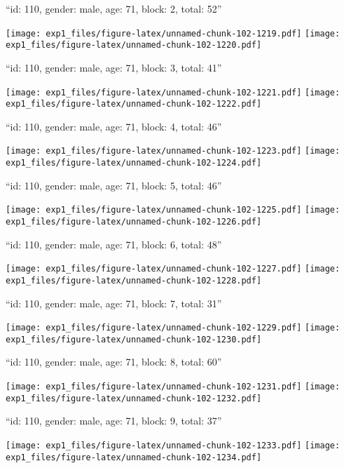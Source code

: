 \documentclass[11pt,,]{article}
\begin{document}
\newpage
[1] 

``id: 110, gender: male, age: 71, block: 2, total: 52''

\texttt{[image: exp1\_files/figure-latex/unnamed-chunk-102-1219.pdf]}
\texttt{[image: exp1\_files/figure-latex/unnamed-chunk-102-1220.pdf]}

\newpage
[1] 

``id: 110, gender: male, age: 71, block: 3, total: 41''

\texttt{[image: exp1\_files/figure-latex/unnamed-chunk-102-1221.pdf]}
\texttt{[image: exp1\_files/figure-latex/unnamed-chunk-102-1222.pdf]}

\newpage
[1] 

``id: 110, gender: male, age: 71, block: 4, total: 46''

\texttt{[image: exp1\_files/figure-latex/unnamed-chunk-102-1223.pdf]}
\texttt{[image: exp1\_files/figure-latex/unnamed-chunk-102-1224.pdf]}

\newpage
[1] 

``id: 110, gender: male, age: 71, block: 5, total: 46''

\texttt{[image: exp1\_files/figure-latex/unnamed-chunk-102-1225.pdf]}
\texttt{[image: exp1\_files/figure-latex/unnamed-chunk-102-1226.pdf]}

\newpage
[1] 

``id: 110, gender: male, age: 71, block: 6, total: 48''

\texttt{[image: exp1\_files/figure-latex/unnamed-chunk-102-1227.pdf]}
\texttt{[image: exp1\_files/figure-latex/unnamed-chunk-102-1228.pdf]}

\newpage
[1] 

``id: 110, gender: male, age: 71, block: 7, total: 31''

\texttt{[image: exp1\_files/figure-latex/unnamed-chunk-102-1229.pdf]}
\texttt{[image: exp1\_files/figure-latex/unnamed-chunk-102-1230.pdf]}

\newpage
[1] 

``id: 110, gender: male, age: 71, block: 8, total: 60''

\texttt{[image: exp1\_files/figure-latex/unnamed-chunk-102-1231.pdf]}
\texttt{[image: exp1\_files/figure-latex/unnamed-chunk-102-1232.pdf]}

\newpage
[1] 

``id: 110, gender: male, age: 71, block: 9, total: 37''

\texttt{[image: exp1\_files/figure-latex/unnamed-chunk-102-1233.pdf]}
\texttt{[image: exp1\_files/figure-latex/unnamed-chunk-102-1234.pdf]}
\end{document}
